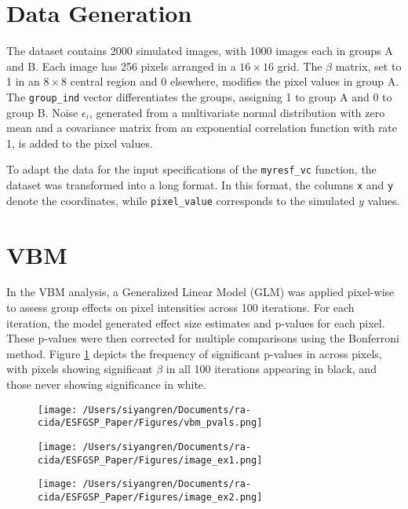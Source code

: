 \documentclass[12pt]{article}
\begin{document}
\section*{Data Generation}

The dataset contains 2000 simulated images, with 1000 images each in groups A and B. Each image has 256 pixels arranged in a \(16 \times 16\) grid. The \(\beta\) matrix, set to 1 in an \(8 \times 8\) central region and 0 elsewhere, modifies the pixel values in group A. The \texttt{group\_ind} vector differentiates the groups, assigning 1 to group A and 0 to group B. Noise \(\epsilon_i\), generated from a multivariate normal distribution with zero mean and a covariance matrix from an exponential correlation function with rate 1, is added to the pixel values.

To adapt the data for the input specifications of the \texttt{myresf\_vc} function, the dataset was transformed into a long format. In this format, the columns \texttt{x} and \texttt{y} denote the coordinates, while \texttt{pixel\_value} corresponds to the simulated $y$ values.

\section*{VBM}

In the VBM analysis, a Generalized Linear Model (GLM) was applied pixel-wise to assess group effects on pixel intensities across 100 iterations. For each iteration, the model generated effect size estimates and p-values for each pixel. These p-values were then corrected for multiple comparisons using the Bonferroni method. Figure \ref{fig:vbm_pvals} depicts the frequency of significant p-values in across pixels, with pixels showing significant \(\beta\) in all 100 iterations appearing in black, and those never showing significance in white.

\begin{figure}[ht]
    \centering
    \texttt{[image: /Users/siyangren/Documents/ra-cida/ESFGSP\_Paper/Figures/vbm\_pvals.png]}
    \caption{}
    \label{fig:vbm_pvals}
\end{figure}

\begin{figure}[ht]
    \centering
    \begin{minipage}[b]{0.45\textwidth}
        \texttt{[image: /Users/siyangren/Documents/ra-cida/ESFGSP\_Paper/Figures/image\_ex1.png]}
    \end{minipage}
    \hfill %
    \begin{minipage}[b]{0.45\textwidth}
        \texttt{[image: /Users/siyangren/Documents/ra-cida/ESFGSP\_Paper/Figures/image\_ex2.png]}
    \end{minipage}
\end{figure}
\end{document}
